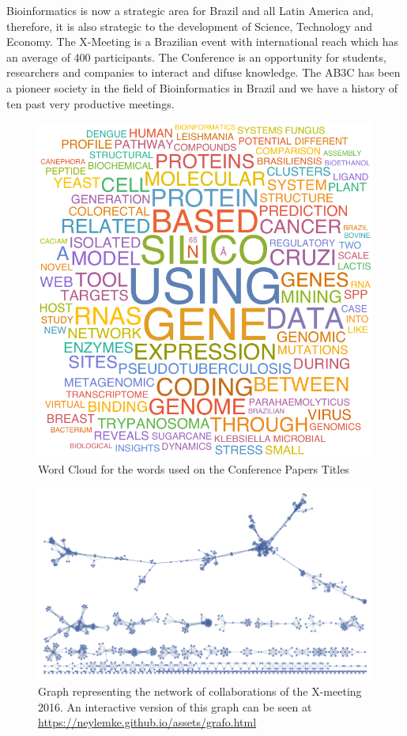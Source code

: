 	
Bioinformatics is now a strategic area for Brazil and all Latin America and,
therefore, it is also strategic to the development of Science, Technology and
Economy. The X-Meeting is a Brazilian event with international reach which has
an average of 400 participants. The Conference is an opportunity for students,
researchers and companies to interact and difuse knowledge. The AB3C has been a
pioneer society in the field of Bioinformatics in Brazil and we have a history
of ten past very productive meetings.

\begin{figure}[h]
    \begin{center}
  \includegraphics[scale=0.7]{wordcloud}
\end{center}
\caption{Word Cloud for the words used on the Conference Papers Titles}
\end{figure}



\begin{figure}[h]
    \begin{center}
  \includegraphics[scale=0.7]{grafo}
\end{center}
\caption{Graph representing the network of collaborations of the X-meeting 2016. An interactive 
version of this graph can be seen at \url{https://neylemke.github.io/assets/grafo.html}}
\end{figure}
